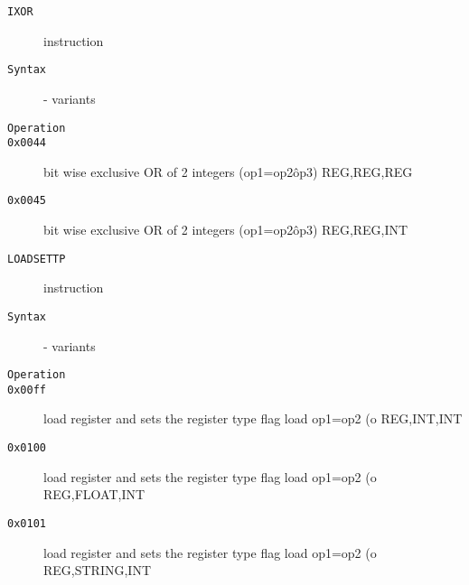 \begin{description}
\item[\texttt{IXOR}] instruction\\
\item[\texttt{Syntax}] - variants\\

\item[\texttt{Operation}]
\item[\texttt{}]
\item[\texttt{0x0044}] bit wise exclusive OR of 2 integers (op1=op2\^op3)  {REG,REG,REG}       \\
\item[\texttt{0x0045}] bit wise exclusive OR of 2 integers (op1=op2\^op3)  {REG,REG,INT}       \\
\end{description}
\clearpage
\begin{description}
\item[\texttt{LOADSETTP}] instruction\\
\item[\texttt{Syntax}] - variants\\

\item[\texttt{Operation}]
\item[\texttt{}]
\item[\texttt{0x00ff}] load register and sets the register type flag load op1=op2 (o  {REG,INT,INT}       \\
\item[\texttt{0x0100}] load register and sets the register type flag load op1=op2 (o  {REG,FLOAT,INT}     \\
\item[\texttt{0x0101}] load register and sets the register type flag load op1=op2 (o  {REG,STRING,INT}    \\
\end{description}

